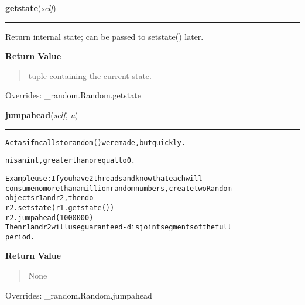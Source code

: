 \hspace{.8\funcindent}\begin{boxedminipage}{\funcwidth}

    \raggedright \textbf{getstate}(\textit{self})

    \vspace{-1.5ex}

    \rule{\textwidth}{0.5\fboxrule}
\setlength{\parskip}{2ex}
    Return internal state; can be passed to setstate() later.

\setlength{\parskip}{1ex}
      \textbf{Return Value}
    \vspace{-1ex}

      \begin{quote}
      tuple containing the current state.

      \end{quote}

      Overrides: \_random.Random.getstate

    \end{boxedminipage}

    \vspace{0.5ex}

\hspace{.8\funcindent}\begin{boxedminipage}{\funcwidth}

    \raggedright \textbf{jumpahead}(\textit{self}, \textit{n})

    \vspace{-1.5ex}

    \rule{\textwidth}{0.5\fboxrule}
\setlength{\parskip}{2ex}
\begin{alltt}
Act as if n calls to random() were made, but quickly.

n is an int, greater than or equal to 0.

Example use:  If you have 2 threads and know that each will
consume no more than a million random numbers, create two Random
objects r1 and r2, then do
    r2.setstate(r1.getstate())
    r2.jumpahead(1000000)
Then r1 and r2 will use guaranteed-disjoint segments of the full
period.
\end{alltt}

\setlength{\parskip}{1ex}
      \textbf{Return Value}
    \vspace{-1ex}

      \begin{quote}
      None

      \end{quote}

      Overrides: \_random.Random.jumpahead

    \end{boxedminipage}

